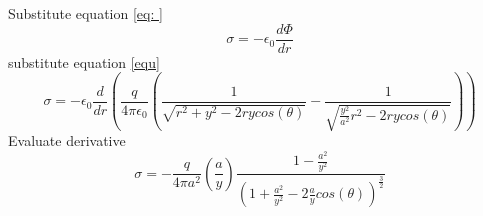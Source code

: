 \documentclass[12pt]{article}
\begin{document}
    Substitute equation \ref{eq: }
    \begin{equation} \label{eq: 9-9-21}
        \sigma = -\epsilon_0 \frac{d\Phi}{dr}
    \end{equation}
    substitute equation \ref{equ}
    \begin{equation} \label{eq: 9-9-22}
        \sigma = -\epsilon_0 \frac{d}{dr}(\frac{q}{4 \pi \epsilon_0} (\frac{1}{\sqrt{r^2 + y^2 - 2 r y cos(\theta)}} - \frac{1}{\sqrt{\frac{y^2}{a^2} r^2 - 2 r y cos(\theta)}}))
    \end{equation}
    Evaluate derivative
    \begin{equation} \label{eq: 9-9-23}
        \sigma = -\frac{q}{4 \pi a^2} (\frac{a}{y}) \frac{1-\frac{a^2}{y^2}}{(1+\frac{a^2}{y^2}-2\frac{a}{y}cos(\theta))^{\frac{3}{2 }}}
    \end{equation}
\end{document}
